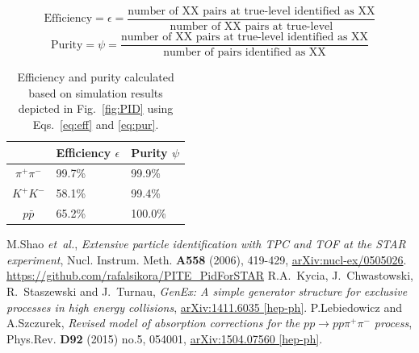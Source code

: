 \documentclass[a4paper,11pt]{article}
\begin{document}
\begin{equation}\label{eq:eff}
 \textrm{Efficiency} = \epsilon = \frac{\textrm{number of XX pairs at true-level identified as XX}}{\textrm{number of XX pairs at true-level}}
\end{equation}
\begin{equation}\label{eq:pur}
 \textrm{Purity} = \psi = \frac{\textrm{number of XX pairs at true-level identified as XX}}{\textrm{number of pairs identified as XX}}
\end{equation}

\begin{table}[hb]
\centering
\begin{tabular}{c|C{2.9cm}|C{2.9cm}}
 & Efficiency $\epsilon$ & Purity $\psi$ \\ \hline
$\pi^{+}\pi^{-}$ & 99.7\% & 99.9\% \\ %
$K^{+}K^{-}$ & 58.1\% & 99.4\% \\ %
$p\bar{p}$ & 65.2\% & 100.0\% \\ %
\end{tabular}
\caption{Efficiency and purity calculated based on simulation results depicted in Fig.~\ref{fig:PID} using Eqs.~\ref{eq:eff} and \ref{eq:pur}.}\label{tab:EfficiencyAndPurity}
\end{table}


\vspace{-10pt}
\begin{thebibliography}{0}
 M.Shao \textit{et~al.}, \textit{Extensive particle identification with TPC and TOF at the STAR experiment}, Nucl. Instrum. Meth. \textbf{A558} (2006), 419-429, \href{http://arxiv.org/abs/nucl-ex/0505026}{arXiv:nucl-ex/0505026}.
 \url{https://github.com/rafalsikora/PITE_PidForSTAR}
 R.A.~Kycia, J.~Chwastowski, R.~Staszewski and J.~Turnau, \textit{GenEx: A simple generator structure for exclusive processes in high energy collisions}, \href{http://arxiv.org/abs/arXiv:1411.6035}{arXiv:1411.6035 [hep-ph]}.
 P.Lebiedowicz and A.Szczurek, \textit{Revised model of absorption corrections for the $p p \to p p \pi^{+} \pi^{-}$ process}, Phys.Rev. \textbf{D92} (2015) no.5, 054001, \href{http://arxiv.org/abs/arXiv:1504.07560}{arXiv:1504.07560 [hep-ph]}.
\end{thebibliography}
\end{document}
